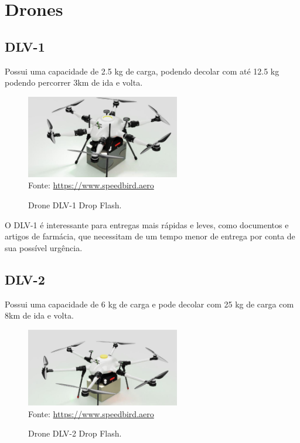 \chapter{Drones}
\label{ch:identificador}

\section{DLV-1}

Possui uma capacidade de 2.5 kg de carga, podendo decolar com até 12.5 kg podendo percorrer 3km de ida e volta.

\begin{figure}[!ht]
    \centering
    \caption{Drone DLV-1 Drop Flash.}
    \includegraphics[width=0.6\textwidth]{figuras/DLV1.png}
    \label{fig:DLV1}\\
    \small Fonte: \url{https://www.speedbird.aero}
\end{figure}

O DLV-1 é interessante para entregas mais rápidas e leves, como documentos e artigos de farmácia, que necessitam de um tempo menor de entrega por conta de sua possível urgência\cite{Speed2024}.

\section{DLV-2}

Possui uma capacidade de 6 kg de carga e pode decolar com 25 kg de carga com 8km de ida e volta.

\begin{figure}[!ht]
    \centering
    \caption{Drone DLV-2 Drop Flash.}
    \includegraphics[width=0.6\textwidth]{figuras/Dlv 2.png}
    \label{fig:DLV2}\\
    \small Fonte: \url{https://www.speedbird.aero}
\end{figure}

